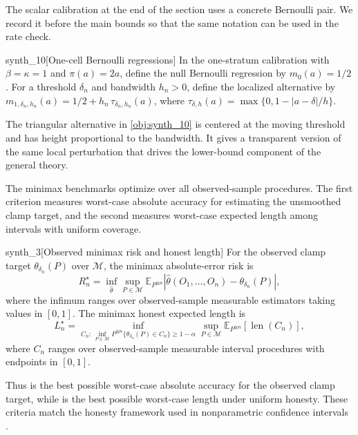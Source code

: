 \documentclass[11pt]{article}
\begin{document}
The scalar calibration at the end of the section uses a concrete Bernoulli pair. We record it before the main bounds so that the same notation can be used in the rate check.

\begin{definitionv}{synth_10}[One-cell Bernoulli regressions]
In the one-stratum calibration with \(\beta=\kappa=1\) and \(\pi(a)=2a\), define the null Bernoulli regression by \(m_0(a)=1/2\). For a threshold \(\delta_n\) and bandwidth \(h_n>0\), define the localized alternative by \(m_{1,\delta_n,h_n}(a)=1/2+h_n\,\tau_{\delta_n,h_n}(a)\), where \(\tau_{\delta,h}(a)=\max\{0,1-|a-\delta|/h\}\).
\end{definitionv}

The triangular alternative in \cref{obj:synth_10} is centered at the moving threshold and has height proportional to the bandwidth. It gives a transparent version of the same local perturbation that drives the lower-bound component of the general theory.

The minimax benchmarks optimize over all observed-sample procedures. The first criterion measures worst-case absolute accuracy for estimating the unsmoothed clamp target, and the second measures worst-case expected length among intervals with uniform coverage.

\begin{definitionv}{synth_3}[Observed minimax risk and honest length]
For the observed clamp target \(\theta_{\delta_n}(P)\) over \(\mathcal M\), the minimax absolute-error risk is
\[
  R_n^\star=\inf_{\widehat\theta}\sup_{P\in\mathcal M}
  \mathbb E_{P^{\otimes n}}\!\left|\widehat\theta(O_1,\ldots,O_n)-\theta_{\delta_n}(P)\right|,
\]
where the infimum ranges over observed-sample measurable estimators taking values in \([0,1]\). The minimax honest expected length is
\[
  L_n^\star=\inf_{C_n:\,\inf_{P\in\mathcal M}P^{\otimes n}\{\theta_{\delta_n}(P)\in C_n\}\ge 1-\alpha}
  \sup_{P\in\mathcal M}\mathbb E_{P^{\otimes n}}[\operatorname{len}(C_n)],
\]
where \(C_n\) ranges over observed-sample measurable interval procedures with endpoints in \([0,1]\).
\end{definitionv}

Thus  is the best possible worst-case absolute accuracy for the observed clamp target, while  is the best possible worst-case length under uniform honesty. These criteria match the honesty framework used in nonparametric confidence intervals \citep{Low1997NonparametricConfidenceIntervals,ArmstrongKolesar2018OptimalInference}.
\end{document}
